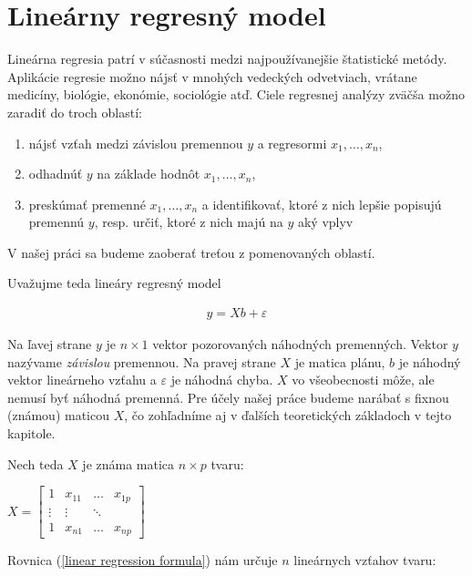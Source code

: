 \section{Lineárny regresný model}
\label{linear regression}
 
Lineárna regresia patrí v súčasnosti medzi najpoužívanejšie štatistické metódy. Aplikácie regresie možno nájsť v mnohých vedeckých odvetviach, 
vrátane medicíny, biológie, ekonómie, sociológie atď. Ciele regresnej analýzy zväčša možno zaradiť do troch oblastí:

\begin{enumerate}
  \item nájsť vzťah medzi závislou premennou $y$ a regresormi $x_1, \ldots, x_n$,
  \item odhadnúť $y$ na základe hodnôt $x_1, \ldots, x_n$,
  \item preskúmať premenné $x_1, \ldots, x_n$ a identifikovať, ktoré z nich lepšie popisujú premennú $y$, resp. určiť, ktoré z nich majú na $y$ aký vplyv
\end{enumerate}

V našej práci sa budeme zaoberať treťou z pomenovaných oblastí.

Uvažujme teda lineáry regresný model

\begin{align}
\label{linear regression formula}
y = Xb + \varepsilon
\end{align}

Na ľavej strane $y$ je $n \times 1$ vektor pozorovaných náhodných premenných. Vektor $y$ nazývame \emph{závislou} premennou.
Na pravej strane $X$ je matica plánu, $b$ je náhodný vektor lineárneho vzťahu a $\varepsilon$ je náhodná chyba.
$X$ vo všeobecnosti môže, ale nemusí byť náhodná premenná. Pre účely našej práce budeme narábať s fixnou (známou) maticou $X$,
čo zohľadníme aj v ďalších teoretických základoch v tejto kapitole.

Nech teda $X$ je známa matica $n \times p$ tvaru:

\begin{center}
$
X =
\begin{bmatrix}
1 & x_{11} & \ldots & x_{1p} \\
\vdots & \vdots & \ddots & \\
1 & x_{n1} & \ldots & x_{np} 
\end{bmatrix}
$
\end{center}

Rovnica (\ref{linear regression formula}) nám určuje $n$ lineárnych vzťahov tvaru:

